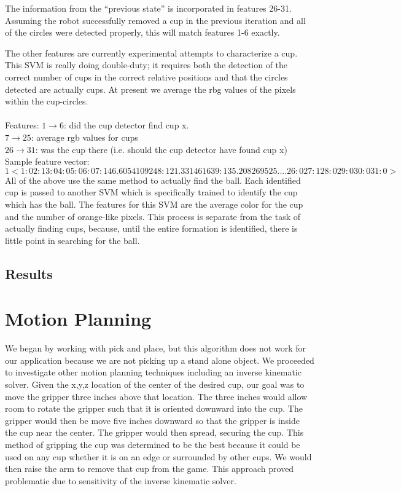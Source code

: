 \documentclass[letterpaper, 10 pt, conference]{ieeeconf}  %
\begin{document}
The information from the “previous state” is incorporated in features 26-31.  Assuming the robot successfully removed a cup in the previous iteration and all of the circles were detected properly, this will match features 1-6 exactly.

The other features are currently experimental attempts to characterize a cup.  This SVM is really doing double-duty; it requires both the detection of the correct number of cups in the correct relative positions and that the circles detected are actually cups.  At present we average the rbg values of the pixels within the cup-circles.\\\\
Features: 
$1 \rightarrow 6$: did the cup detector find cup x. \\
$7 \rightarrow 25$: average rgb values for cups\\
$26 \rightarrow 31$: was the cup there (i.e. should the cup detector have found cup x)\\

Sample feature vector:\\

$1  <1:0 2:1 3:0 4:0 5:0 6:0 7:146.605410924 8:121.33146163 9:135.208269525 .... 26:0 27:1 28:0 29:0 30:0 31:0>$ \\


All of the above use the same method to actually find the ball.  Each identified cup is passed to another SVM which is specifically trained to identify the cup which has the ball.  The features for this SVM are the average color for the cup and the number of orange-like pixels.  This process is separate from the task of actually finding cups, because, until the entire formation is identified, there is little point in searching for the ball.

\subsection{Results}


\section{Motion Planning}

We began by working with pick and place, but this algorithm does not work for our application because we are not picking up a stand alone object. We proceeded to investigate other motion planning techniques including an inverse kinematic solver. Given the x,y,z location of the center of the desired cup, our goal was to move the gripper three inches above that location. The three inches would allow room to rotate the gripper such that it is oriented downward into the cup. The gripper would then be move five inches downward so that the gripper is inside the cup near the center. The gripper would then spread, securing the cup. This method of gripping the cup was determined to be the best because it could be used on any cup whether it is on an edge or surrounded by other cups. We would then raise the arm to remove that cup from the game.  This approach proved problematic due to sensitivity of the inverse kinematic solver. 
\end{document}

